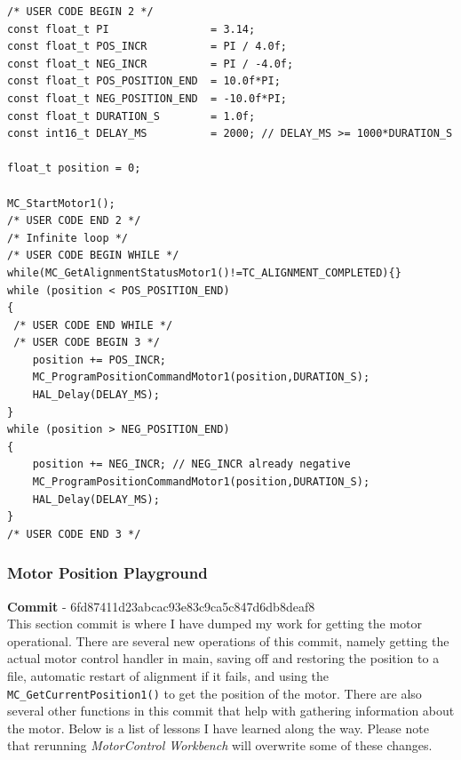 \documentclass[10pt]{article}
\begin{document}
                \begin{verbatim}
/* USER CODE BEGIN 2 */
const float_t PI                = 3.14;
const float_t POS_INCR          = PI / 4.0f;
const float_t NEG_INCR          = PI / -4.0f;
const float_t POS_POSITION_END  = 10.0f*PI;
const float_t NEG_POSITION_END  = -10.0f*PI;
const float_t DURATION_S        = 1.0f;
const int16_t DELAY_MS          = 2000; // DELAY_MS >= 1000*DURATION_S

float_t position = 0;

MC_StartMotor1();
/* USER CODE END 2 */
/* Infinite loop */
/* USER CODE BEGIN WHILE */
while(MC_GetAlignmentStatusMotor1()!=TC_ALIGNMENT_COMPLETED){}
while (position < POS_POSITION_END)
{
 /* USER CODE END WHILE */
 /* USER CODE BEGIN 3 */
    position += POS_INCR;
    MC_ProgramPositionCommandMotor1(position,DURATION_S);
    HAL_Delay(DELAY_MS);
}
while (position > NEG_POSITION_END)
{
    position += NEG_INCR; // NEG_INCR already negative
    MC_ProgramPositionCommandMotor1(position,DURATION_S);
    HAL_Delay(DELAY_MS);
}
/* USER CODE END 3 */
                \end{verbatim}
			\FloatBarrier \subsubsection{Motor Position Playground}
                \textbf{Commit} - 6fd87411d23abcac93e83c9ca5c847d6db8deaf8 \\
                This section commit is where I have dumped my work for getting the motor operational. There are several new operations of this commit, namely getting the actual motor control handler in main, saving off and restoring the position to a file, automatic restart of alignment if it fails, and using the \texttt{MC\_GetCurrentPosition1()} to get the position of the motor. There are also several other functions in this commit that help with gathering information about the motor. Below is a list of lessons I have learned along the way. Please note that rerunning \emph{MotorControl Workbench} will overwrite some of these changes. 
\end{document}
